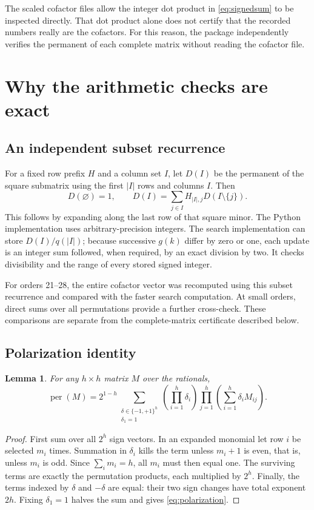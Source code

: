 \documentclass[11pt,a4paper]{article}
\newtheorem{lemma}[theorem]{Lemma}
\theoremstyle{remark}\newtheorem{remark}[theorem]{Remark}
\DeclareMathOperator{\per}{per}
\begin{document}
The scaled cofactor files allow the integer dot product in \eqref{eq:signedsum} to be inspected directly. That dot product alone does not certify that the recorded numbers really are the cofactors. For this reason, the package independently verifies the permanent of each complete matrix without reading the cofactor file.

\section{Why the arithmetic checks are exact}
\subsection{An independent subset recurrence}
For a fixed row prefix $H$ and a column set $I$, let $D(I)$ be the permanent of the square submatrix using the first $|I|$ rows and columns $I$. Then
\begin{equation}\label{eq:dp}
 D(\varnothing)=1,\qquad
 D(I)=\sum_{j\in I}H_{|I|,j}D(I\setminus\{j\}).
\end{equation}
This follows by expanding along the last row of that square minor. The Python implementation uses arbitrary-precision integers. The search implementation can store $D(I)/q(|I|)$; because successive $g(k)$ differ by zero or one, each update is an integer sum followed, when required, by an exact division by two. It checks divisibility and the range of every stored signed integer.

For orders 21--28, the entire cofactor vector was recomputed using this subset recurrence and compared with the faster search computation. At small orders, direct sums over all permutations provide a further cross-check. These comparisons are separate from the complete-matrix certificate described below.

\subsection{Polarization identity}
\begin{lemma}\label{lem:polarization}
For any $h\times h$ matrix $M$ over the rationals,
\begin{equation}\label{eq:polarization}
 \per(M)=2^{1-h}\!\sum_{\substack{\delta\in\{-1,+1\}^h\\\delta_1=1}}
 \left(\prod_{i=1}^h\delta_i\right)
 \prod_{j=1}^h\left(\sum_{i=1}^h\delta_iM_{ij}\right).
\end{equation}
\end{lemma}
\begin{proof}
First sum over all $2^h$ sign vectors. In an expanded monomial let row $i$ be selected $m_i$ times. Summation in $\delta_i$ kills the term unless $m_i+1$ is even, that is, unless $m_i$ is odd. Since $\sum_i m_i=h$, all $m_i$ must then equal one. The surviving terms are exactly the permutation products, each multiplied by $2^h$. Finally, the terms indexed by $\delta$ and $-\delta$ are equal: their two sign changes have total exponent $2h$. Fixing $\delta_1=1$ halves the sum and gives \eqref{eq:polarization}.
\end{proof}
\end{document}

